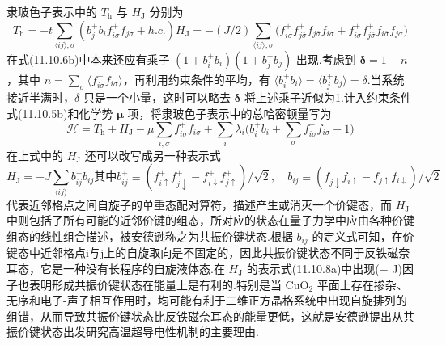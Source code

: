 隶玻色子表示中的 $T_{\mathrm{h}}$ 与 $H_{\mathrm{J}}$ 分别为
\begin{subequations}
\begin{equation}
  T_{\mathrm{h}}=-t\sum_{\langle ij\rangle,\sigma}(b_{j}^{+}b_{i}f_{i\sigma}^{+}f_{j\sigma}+h.c.)
\end{equation}
\begin{equation}
  H_{\mathrm{J}}=-(J/2)\sum_{\langle ij\rangle,\sigma}
  \bigl(f_{i\sigma}^{+}f_{j\overline{\sigma}}^{+}f_{j\overline{\sigma}}f_{i\sigma}
  +f_{i\sigma}^{+}f_{j\overline{\sigma}}^{+}f_{i\overline{\sigma}}f_{j\sigma}\bigr)
\end{equation}
\end{subequations}
在式(11.10.6b)中本来还应有乘子 $(1+b_{i}^{+}b_{i})(1+b_{j}^{+}b_{j})$ 出现.考虑到 $\boldsymbol{\delta}=1-n$，其中 $n=\sum_{\sigma}\langle f_{i\sigma}^{+}f_{i\sigma}\rangle$，再利用约束条件的平均，有 $\langle b_{i}^{+}b_{i}\rangle=\langle b_{j}^{+}b_{j}\rangle=\delta$.当系统接近半满时，$\delta$ 只是一个小量，这时可以略去 $\boldsymbol{\delta}$ 将上述乘子近似为1.计入约束条件式(11.10.5b)和化学势 $\boldsymbol{\mu}$ 项，将隶玻色子表示中的总哈密顿量写为
\begin{equation}
  \mathscr{H}=T_{\mathrm{h}}+H_{\mathrm{J}}-\mu\sum_{i,\sigma}f_{i\sigma}^{+}f_{i\sigma}
  +\sum_{i}\lambda_{i}\biggl(b_{i}^{+}b_{i}+\sum_{\sigma}f_{i\sigma}^{+}f_{i\sigma}-1\biggr)
\end{equation}
在上式中的 $H_{\mathrm{J}}$ 还可以改写成另一种表示式
\begin{subequations}
\begin{equation}
  H_{\mathrm{J}}=-J\sum_{\langle ij\rangle}b_{ij}^{+}b_{ij}
\end{equation}
其中
\begin{equation}
  b_{ij}^{+}\equiv(f_{i\uparrow}^{+}f_{j\downarrow}^{+}-f_{i\downarrow}^{+}f_{j\uparrow}^{+})/\sqrt{2},\quad
  b_{ij}\equiv(f_{j\downarrow}f_{i\uparrow}-f_{j\uparrow}f_{i\downarrow})/\sqrt{2}
\end{equation}
\end{subequations}
代表近邻格点之间自旋子的单重态配对算符，描述产生或消灭一个价键态，而 $H_{\mathrm{J}}$ 中则包括了所有可能的近邻价键的组态，所对应的状态在量子力学中应由各种价键组态的线性组合描述，被安德逊称之为共振价键状态.根据 $b_{ij}$ 的定义式可知，在价键态中近邻格点i与j上的自旋取向是不固定的，因此共振价键状态不同于反铁磁奈耳态，它是一种没有长程序的自旋液体态.在 $H_{\mathrm{J}}$ 的表示式(11.10.8a)中出现($-$ J)因子也表明形成共振价键状态在能量上是有利的.特别是当 $\mathrm{CuO_{2}}$ 平面上存在掺杂、无序和电子-声子相互作用时，均可能有利于二维正方晶格系统中出现自旋排列的组错，从而导致共振价键状态比反铁磁奈耳态的能量更低，这就是安德逊提出从共振价键状态出发研究高温超导电性机制的主要理由.

